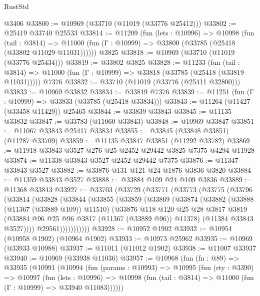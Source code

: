 \begin{lexlean}{RustStd}
\begin{coremodule}
    @3406
@33800 := @10969 (@33710 (@11019 (@33776 @25412)))
@33802 := @25419 @33740 @25533
@33814 := @11209
    (fun (lets : @10996) =>
    @10998
      (fun (tail : @3814) =>
      @11000 (fun (Γ : @10999) => @33800 (@33785 (@25418 (@33802 @11029 @11031))))))
    @3825
@33818 := @10969 (@33710 (@11019 (@33776 @25434)))
@33819 := @33802 @3825
@33828 := @11233
    (fun (tail : @3814) => @11000 (fun (Γ : @10999) => @33818 (@33785 (@25418 (@33819 @11031)))))
    @7376
@33832 := @33710 (@11019 (@33776 (@25411 @32800)))
@33833 := @10969 @33832
@33834 := @33819 @7376
@33839 := @11251 (fun (Γ : @10999) => @33833 (@33785 (@25418 @33834)))
@33843 := @11264 (@11427 (@33458 @11429)) @25465
@33844 := @33839 @33843
@33845 := @11135 @33832
@33847 := @33783 (@11060 @33843)
@33848 := @10969 @33847
@33851 := @11067 @33843 @25417 @33834
@33855 := @33845 (@33848 @33851) (@11287 @33709)
@33859 := @11135 @33847 @33851 (@11292 @33782)
@33869 := @11918 @33843 @3527 @276 @25 @2452 @29442 @3825 @7375 @4294 @11928
@33874 := @11338 @33843 @3527 @2452 @29442 @7375
@33876 := @11347 @33843 @3527
@33882 := @33876 @131 @121 @24 @1876 @3836 @3820
@33884 := @11359 @33843 @3527
@33888 := @33884 @109 @24 @109 @3836
@33889 := @11368 @33843
@33927 := @33703
    (@33729
      (@33771
        (@33773
          (@33775
            (@33796
              (@33814
                (@33828
                  (@33844
                    (@33855
                      (@33859
                        (@33869
                          (@33874
                            (@33882
                              (@33888 (@11367 (@33889 @109)) @11510)
                              (@33876
                                @118
                                @120
                                @25
                                @28
                                @3817
                                @3819
                                (@33884 @96 @25 @96 @3817 (@11367 (@33889 @96)) @11378)
                                (@11384 @33843 @3527))))
                          @29561)))))))))))
@33928 := @10952 @1902
@33932 := @10954 (@10958 @1902) (@10964 @1902)
@33933 := @10973 @25962
@33935 := @10969 (@33933 @10988)
@33937 := @11011 (@11012 @1902)
@33938 := @11007 @33937
@33940 := @10969 (@33938 @11036)
@33957 := @10968
    (fun (fn : @89) =>
    @33935
      (@10991
        (@10994
          (fun (params : @10993) =>
          @10995
            (fun (rty : @3390) =>
            @10997
              (fun (lets : @10996) =>
              @10998 (fun (tail : @3814) => @11000 (fun (Γ : @10999) => @33940 @11083))))))

\end{coremodule}
\end{lexlean}
